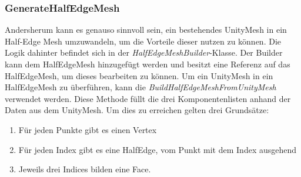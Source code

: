\subsubsection{GenerateHalfEdgeMesh}
Andersherum kann es genauso sinnvoll sein, ein bestehendes UnityMesh in ein Half-Edge Mesh umzuwandeln, um die Vorteile dieser nutzen zu k\"onnen. Die Logik dahinter befindet sich in der \textit{HalfEdgeMeshBuilder}-Klasse. Der Builder kann dem HalfEdgeMesh hinzugef\"ugt werden und besitzt eine Referenz auf das HalfEdgeMesh, um dieses bearbeiten zu k\"onnen. Um ein UnityMesh in ein HalfEdgeMesh zu \"uberf\"uhren, kann die \textit{BuildHalfEdgeMeshFromUnityMesh} verwendet werden. Diese Methode f\"ullt die drei Komponentenlisten anhand der Daten aus dem UnityMesh. 
Um dies zu erreichen gelten drei Grunds\"atze:
\begin{enumerate}
	\item F\"ur jeden Punkte gibt es einen Vertex
	\item F\"ur jeden Index gibt es eine HalfEdge, vom Punkt mit dem Index ausgehend
	\item Jeweils drei Indices bilden eine Face.
\end{enumerate}
